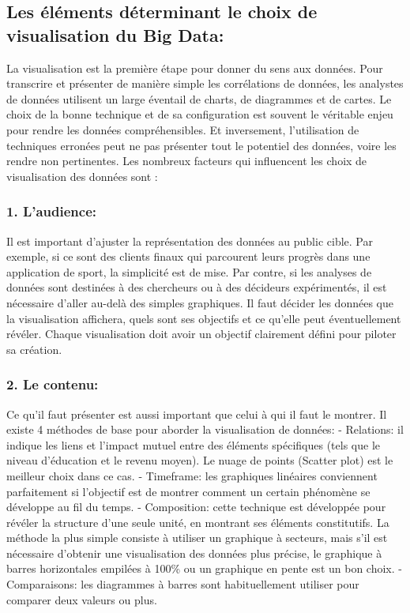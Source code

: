 \documentclass[french, a4paper, 12pt]{report}
\begin{document}
\subsection{Les éléments déterminant le choix de visualisation du Big Data:}
La visualisation est la première étape pour donner du sens aux données. Pour transcrire et présenter de manière simple les corrélations de données, les analystes de données utilisent un large éventail de charts, de diagrammes et de cartes. Le choix de la bonne technique et de sa configuration est souvent le véritable enjeu pour rendre les données compréhensibles. Et inversement, l’utilisation de techniques erronées peut ne pas présenter tout le potentiel des données, voire les rendre non pertinentes. Les nombreux facteurs qui influencent les choix de visualisation des données sont :
\subsubsection{1. L’audience:}
Il est important d’ajuster la représentation des données au public cible. Par exemple, si ce sont des clients finaux qui parcourent leurs progrès dans une application de sport, la simplicité est de mise. Par contre, si les analyses de données sont destinées à des chercheurs ou à des décideurs expérimentés, il est nécessaire d’aller au-delà des simples graphiques.
Il faut décider les données que la visualisation affichera, quels sont ses objectifs et ce qu’elle peut éventuellement révéler. Chaque visualisation doit avoir un objectif clairement défini pour piloter sa création.
\subsubsection{2. Le contenu:}
Ce qu’il faut présenter est aussi important que celui à qui il faut le montrer. Il existe 4 méthodes de base pour aborder la visualisation de données:
- Relations: il indique les liens et l'impact mutuel entre des éléments spécifiques (tels que le niveau d'éducation et le revenu moyen). Le nuage de points (Scatter plot) est le meilleur choix dans ce cas.
- Timeframe: les graphiques linéaires conviennent parfaitement si l’objectif est de montrer comment un certain phénomène se développe au fil du temps.
- Composition: cette technique est développée pour révéler la structure d'une seule unité, en montrant ses éléments constitutifs. La méthode la plus simple consiste à utiliser un graphique à secteurs, mais s’il est nécessaire d’obtenir une visualisation des données plus précise, le graphique à barres horizontales empilées à 100\% ou un graphique en pente est un bon choix.
- Comparaisons: les diagrammes à barres sont habituellement utiliser pour  comparer deux valeurs ou plus.
\end{document}
